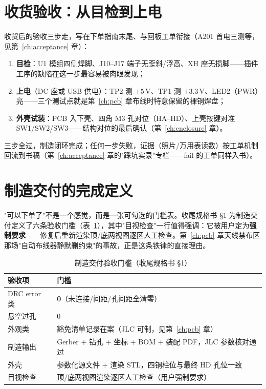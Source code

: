 \section{收货验收：从目检到上电}
\label{sec:fab-receive}

收货后的验收三步走，写在下单指南末尾、与回板工单衔接（A201 首电三测等，见第~\ref{ch:acceptance} 章）：

\begin{enumerate}
  \item \textbf{目检}：U1 模组四侧焊脚、J10--J17 端子无歪斜/浮高、XH 座无损脚——插件工序的缺陷在这一步最容易被肉眼发现；
  \item \textbf{上电}（DC 座或 USB 供电）：TP2 测 $+5$\,V、TP1 测 $+3.3$\,V、LED2（PWR）亮——三个测试点就是第~\ref{ch:pcb} 章布线时特意保留的裸铜焊盘；
  \item \textbf{外壳试装}：PCB 入下壳、四角 M3 孔对位（HA--HD）、上壳按键对准 SW1/SW2/SW3——结构对位的最后确认（第~\ref{ch:enclosure} 章）。
\end{enumerate}

三步全过，制造闭环完成；任何一步失败，证据（照片/万用表读数）按工单机制回流到书稿（第~\ref{ch:acceptance} 章的"踩坑实录"专栏——fail 的工单同样入书）。

\section{制造交付的完成定义}
\label{sec:fab-done}

"可以下单了"不是一个感觉，而是一张可勾选的门槛表。收尾规格书 \S1 为制造交付定义了六条验收门槛（表~\ref{tab:fab-gate}），其中"目视检查"一行值得强调：它被用户定为\textbf{强制要求}——修复后重新渲染顶/底两视图逐区人工检查。第~\ref{ch:pcb} 章天线禁布区那场"自动布线器静默删约束"的事故，正是这条铁律的直接理由。

\begin{table}[htbp]
  \centering
  \caption{制造交付验收门槛（收尾规格书 \S1）}
  \label{tab:fab-gate}
  \begin{tabular}{lp{8.2cm}}
    \toprule
    验收项 & 门槛 \\
    \midrule
    DRC error 类 & \textbf{0}（未连接/间距/孔间距全清零） \\
    悬空过孔 & 0 \\
    外观类 & 豁免清单记录在案（JLC 可制，见第~\ref{ch:pcb} 章） \\
    制造输出 & Gerber + 钻孔 + 坐标 + BOM + 装配 PDF，JLC 参数核对通过 \\
    外壳 & 参数化源文件 + 渲染 STL，四铜柱位与最终 HD 孔位一致 \\
    目视检查 & 顶/底两视图渲染逐区人工检查（用户强制要求） \\
    \bottomrule
  \end{tabular}
\end{table}

